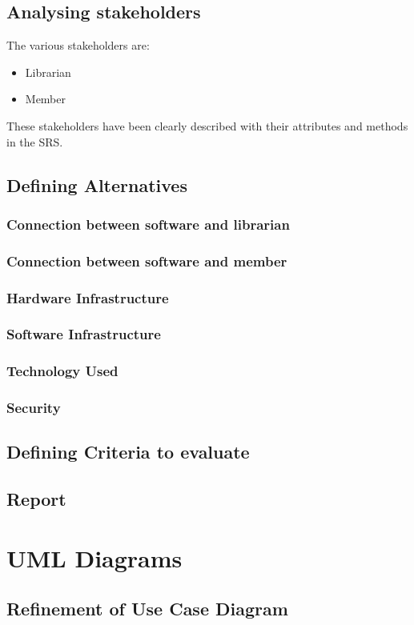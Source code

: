 \documentclass{article}
\begin{document}
\subsection{Analysing stakeholders}
The various stakeholders are:
\begin{itemize}
\item Librarian
\item Member
\end{itemize}
These stakeholders have been clearly described with their attributes and methods in the SRS.
\subsection{Defining Alternatives}
\subsubsection{Connection between software and librarian}
\subsubsection{Connection between software and member}
\subsubsection{Hardware Infrastructure}
\subsubsection{Software Infrastructure}
\subsubsection{Technology Used}
\subsubsection{Security}
\subsection{Defining Criteria to evaluate}
\subsection{Report}
\section{UML Diagrams}

\subsection{Refinement of Use Case Diagram}
\end{document}
